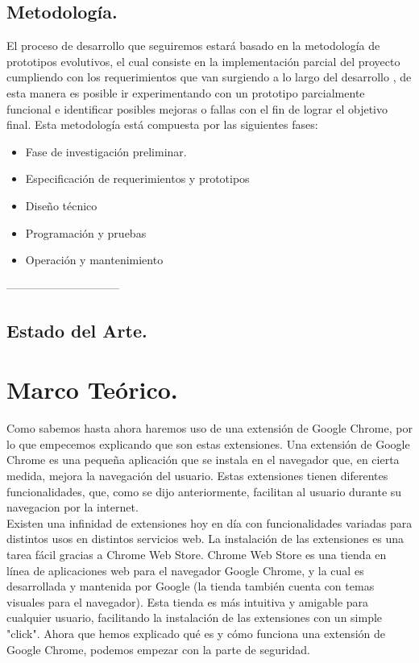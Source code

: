 \documentclass[12pt, a4paper, titlepage]{article}
\begin{document}
		\subsection{Metodología.}
		El proceso de desarrollo que seguiremos estará basado en la metodología de prototipos evolutivos, el cual consiste en la implementación parcial del proyecto cumpliendo con los requerimientos que van surgiendo a lo largo del desarrollo , de esta manera es posible ir experimentando con un prototipo parcialmente funcional e identificar posibles mejoras o fallas con el fin de lograr el objetivo final.
		Esta metodología está compuesta por las siguientes fases:
		\begin{itemize}
		    \item Fase de investigación preliminar.
		    \item Especificación de requerimientos y prototipos
		    \item Diseño técnico
		    \item Programación y pruebas
		    \item Operación y mantenimiento
		\end{itemize}
		------------------------------
		\subsection{Estado del Arte.}
	\newpage
	\section{\textcolor{azulescom}{Marco Teórico.}}
		Como sabemos hasta ahora haremos uso de una extensión de Google Chrome, por lo que empecemos explicando que son estas extensiones. Una extensión de Google Chrome es una pequeña aplicación que se instala en el navegador que, en cierta medida, mejora la navegación del usuario. Estas extensiones tienen diferentes funcionalidades, que, como se dijo anteriormente, facilitan al usuario durante su navegacion por la internet.\\
		Existen una infinidad de extensiones hoy en día con funcionalidades variadas para distintos usos en distintos servicios web. La instalación de las extensiones es una tarea fácil gracias a Chrome Web Store. Chrome Web Store es una tienda en línea de aplicaciones web para el navegador Google Chrome, y la cual es desarrollada y mantenida por Google (la tienda también cuenta con temas visuales para el navegador). Esta tienda es más intuitiva y amigable para cualquier usuario, facilitando la instalación de las extensiones con un simple "click". Ahora que hemos explicado qué es y cómo funciona una extensión de Google Chrome, podemos empezar con la parte de seguridad. 
\end{document}
